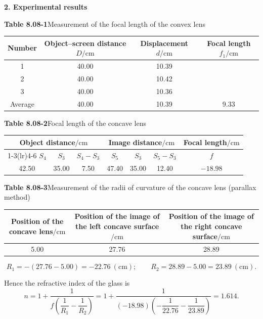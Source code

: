 \textbf{2. Experimental results}

\begin{center}
\textbf{Table 8.08-1}\quad Measurement of the focal length of the convex lens\\[3pt]
\begin{tabular}{cccc}
\toprule
Number & Object--screen distance $D/\mathrm{cm}$ & Displacement $d/\mathrm{cm}$ & Focal length $f_1/\mathrm{cm}$ \\
\midrule
1 & 40.00 & 10.39 & \\
2 & 40.00 & 10.42 & \\
3 & 40.00 & 10.36 & \\
\midrule
Average & 40.00 & 10.39 & 9.33 \\
\bottomrule
\end{tabular}
\end{center}

\begin{center}
\textbf{Table 8.08-2}\quad Focal length of the concave lens\\[3pt]
\begin{tabular}{ccccccc}
\toprule
\multicolumn{3}{c}{Object distance$/\mathrm{cm}$} & \multicolumn{3}{c}{Image distance$/\mathrm{cm}$} & Focal length$/\mathrm{cm}$ \\
\cmidrule(lr){1-3}\cmidrule(lr){4-6}
$S_4$ & $S_3$ & $S_4-S_3$ & $S_5$ & $S_3$ & $S_5-S_3$ & $f$ \\
\midrule
42.50 & 35.00 & 7.50 & 47.40 & 35.00 & 12.40 & $-18.98$ \\
\bottomrule
\end{tabular}
\end{center}

\begin{center}
\textbf{Table 8.08-3}\quad Measurement of the radii of curvature of the concave lens (parallax method)\\[3pt]
\begin{tabular}{ccc}
\toprule
Position of the concave lens$/\mathrm{cm}$ & Position of the image of the left concave surface$/\mathrm{cm}$ & Position of the image of the right concave surface$/\mathrm{cm}$ \\
\midrule
5.00 & 27.76 & 28.89 \\
\bottomrule
\end{tabular}
\end{center}

\[
R_1=-(27.76-5.00)=-22.76\ (\mathrm{cm});\qquad R_2=28.89-5.00=23.89\ (\mathrm{cm}).
\]

Hence the refractive index of the glass is
\[
n=1+\frac{1}{f\left(\dfrac{1}{R_1}-\dfrac{1}{R_2}\right)}
=1+\frac{1}{(-18.98)\left(-\dfrac{1}{22.76}-\dfrac{1}{23.89}\right)}=1.614.
\]

